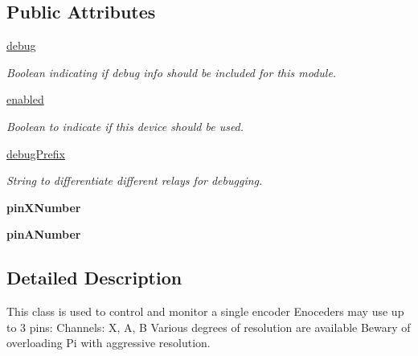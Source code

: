 \subsection*{Public Attributes}
\begin{DoxyCompactItemize}
\item 
\mbox{\label{classmcs_1_1firmware_1_1AMT103_1_1AMT103_abfb2f694f17482ab6a917ce09c253edf}} 
\hyperlink{classmcs_1_1firmware_1_1AMT103_1_1AMT103_abfb2f694f17482ab6a917ce09c253edf}{debug}
\begin{DoxyCompactList}\small\item\em Boolean indicating if debug info should be included for this module. \end{DoxyCompactList}\item 
\mbox{\label{classmcs_1_1firmware_1_1AMT103_1_1AMT103_a7d444eb53c8b940b983bf9db19a5ca4a}} 
\hyperlink{classmcs_1_1firmware_1_1AMT103_1_1AMT103_a7d444eb53c8b940b983bf9db19a5ca4a}{enabled}
\begin{DoxyCompactList}\small\item\em Boolean to indicate if this device should be used. \end{DoxyCompactList}\item 
\mbox{\label{classmcs_1_1firmware_1_1AMT103_1_1AMT103_ab6dd8d34c9e9c61ef93dd64149860b6a}} 
\hyperlink{classmcs_1_1firmware_1_1AMT103_1_1AMT103_ab6dd8d34c9e9c61ef93dd64149860b6a}{debug\+Prefix}
\begin{DoxyCompactList}\small\item\em String to differentiate different relays for debugging. \end{DoxyCompactList}\item 
\mbox{\label{classmcs_1_1firmware_1_1AMT103_1_1AMT103_a04e3cc73731975718a15cc3a308729d8}} 
{\bfseries pin\+X\+Number}
\item 
\mbox{\label{classmcs_1_1firmware_1_1AMT103_1_1AMT103_ab374525c7af3df81f314059b915e0687}} 
{\bfseries pin\+A\+Number}
\end{DoxyCompactItemize}


\subsection{Detailed Description}
This class is used to control and monitor a single encoder Enoceders may use up to 3 pins\+: Channels\+: X, A, B Various degrees of resolution are available Bewary of overloading Pi with aggressive resolution. 

